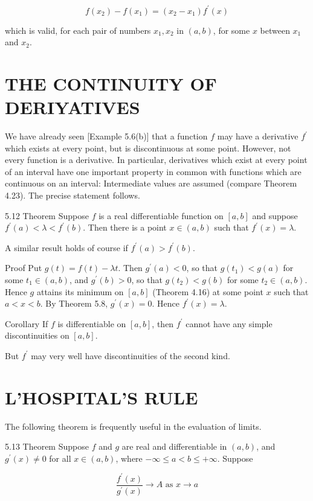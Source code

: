 \documentclass[10pt]{article}
\begin{document}
$$
f\left(x_{2}\right)-f\left(x_{1}\right)=\left(x_{2}-x_{1}\right) f^{\prime}(x)
$$

which is valid, for each pair of numbers $x_{1}, x_{2}$ in $(a, b)$, for some $x$ between $x_{1}$ and $x_{2}$.

\section{THE CONTINUITY OF DERIYATIVES}
We have already seen [Example 5.6(b)] that a function $f$ may have a derivative $f^{\prime}$ which exists at every point, but is discontinuous at some point. However, not every function is a derivative. In particular, derivatives which exist at every point of an interval have one important property in common with functions which are continuous on an interval: Intermediate values are assumed (compare Theorem 4.23). The precise statement follows.

5.12 Theorem Suppose $f$ is a real differentiable function on $[a, b]$ and suppose $f^{\prime}(a)<\lambda<f^{\prime}(b)$. Then there is a point $x \in(a, b)$ such that $f^{\prime}(x)=\lambda$.

A similar result holds of course if $f^{\prime}(a)>f^{\prime}(b)$.

Proof Put $g(t)=f(t)-\lambda t$. Then $g^{\prime}(a)<0$, so that $g\left(t_{1}\right)<g(a)$ for some $t_{1} \in(a, b)$, and $g^{\prime}(b)>0$, so that $g\left(t_{2}\right)<g(b)$ for some $t_{2} \in(a, b)$. Hence $g$ attains its minimum on $[a, b]$ (Theorem 4.16) at some point $x$ such that $a<x<b$. By Theorem 5.8, $g^{\prime}(x)=0$. Hence $f^{\prime}(x)=\lambda$.

Corollary If $f$ is differentiable on $[a, b]$, then $f^{\prime}$ cannot have any simple discontinuities on $[a, b]$.

But $f^{\prime}$ may very well have discontinuities of the second kind.

\section{L'HOSPITAL'S RULE}
The following theorem is frequently useful in the evaluation of limits.

5.13 Theorem Suppose $f$ and $g$ are real and differentiable in $(a, b)$, and $g^{\prime}(x) \neq 0$ for all $x \in(a, b)$, where $-\infty \leq a<b \leq+\infty$. Suppose

$$
\frac{f^{\prime}(x)}{g^{\prime}(x)} \rightarrow A \text { as } x \rightarrow a
$$
\end{document}
